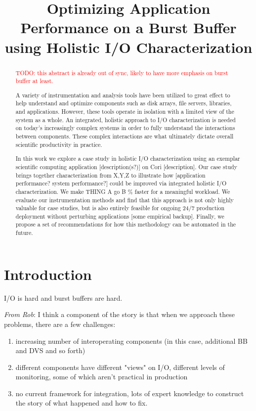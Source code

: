 \documentclass[conference,10pt,compsocconf]{IEEEtran}
\begin{document}
\title{Optimizing Application Performance on a Burst Buffer using
Holistic I/O Characterization}

\maketitle

\begin{abstract}

\textcolor{red}{TODO: this abstract is already out of sync, likely to have
more emphasis on burst buffer at least.}

A variety of instrumentation and analysis tools have been utilized to
great effect to help understand and optimize components such as disk
arrays, file servers, libraries, and applications.  However, these
tools operate in isolation with a limited view of the system as a whole.
An integrated, holistic approach to I/O characterization is needed on
today's increasingly complex systems in order to fully understand
the interactions between components.  These complex interactions are what 
ultimately dictate overall scientific productivity in practice.

In this work we explore a case study in holistic I/O characterization
using an exemplar scientific computing application [description(s?)] on
Cori [description].  Our case study brings together characterization from
X,Y,Z to illustrate how [application performance?  system performance?]
could be improved via integrated holistic I/O characterization.
We make THING A go B \% faster for a meaningful workload.  We evaluate
our instrumentation methods and find that this approach is not only
highly valuable for case studies, but is also entirely feasible for
ongoing 24/7 production deployment without perturbing applications [some
empirical backup].  Finally, we propose a set of recommendations for
how this methodology can be automated in the future.

\end{abstract}

\section{Introduction}

I/O is hard and burst buffers are hard.

\emph{From Rob}: I think a component of the story is that when we approach these problems, there are a few challenges:
\begin{enumerate}
\item increasing number of interoperating components (in this case, additional
BB and DVS and so forth)
\item different components have different "views" on I/O, different levels of
monitoring, some of which aren't practical in production
\item no current framework for integration, lots of expert knowledge to
construct the story of what happened and how to fix.
\end{enumerate}
\end{document}
